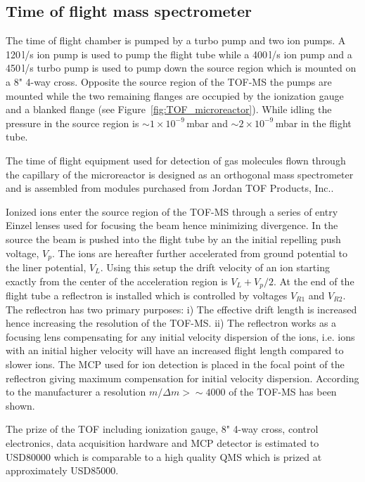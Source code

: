 \documentclass[aip,rsi]{revtex4-1}
\begin{document}
\subsection{Time of flight mass spectrometer}
The time of flight chamber is pumped by a turbo pump and two ion pumps. A 120\,l/s ion pump is used to pump the flight tube while a 400\,l/s ion pump and a 450\,l/s turbo pump is used to pump down the source region which is mounted on a 8" 4-way cross. Opposite the source region of the TOF-MS the pumps are mounted while the two remaining flanges are occupied by the ionization gauge and a blanked flange (see Figure~\ref{fig:TOF_microreactor}). While idling the pressure in the source region is $\sim1\times10^{-9}$\,mbar and $\sim2\times10^{-9}$\,mbar in the flight tube.

The time of flight equipment used for detection of gas molecules flown through the capillary of the microreactor is designed as an orthogonal mass spectrometer and is assembled from modules purchased from Jordan TOF Products, Inc.\cite{JordanHomepage}. 

Ionized ions enter the source region of the TOF-MS through a series of entry Einzel lenses used for focusing the beam hence minimizing divergence. In the source the beam is pushed into the flight tube by an the initial repelling push voltage, $V_p$. The ions are hereafter further accelerated from ground potential to the liner potential, $V_L$. Using this setup the drift velocity of an ion starting exactly from the center of the acceleration region is $V_L + V_p/2$. At the end of the flight tube a reflectron is installed which is controlled by voltages $V_{R1}$ and $V_{R2}$. The reflectron has two primary purposes: i) The effective drift length is increased hence increasing the resolution of the TOF-MS. ii) The reflectron works as a focusing lens compensating for any initial velocity dispersion of the ions, i.e. ions with an initial higher velocity will have an increased flight length compared to slower ions. The MCP used for ion detection is placed in the focal point of the reflectron giving maximum compensation for initial velocity dispersion. According to the manufacturer a resolution $m/\Delta m>\sim4000$ of the TOF-MS has been shown.

The prize of the TOF including ionization gauge, 8" 4-way cross, control electronics, data acquisition hardware and MCP detector is estimated to USD80000 which is comparable to a high quality QMS which is prized at approximately USD85000.
\end{document}
